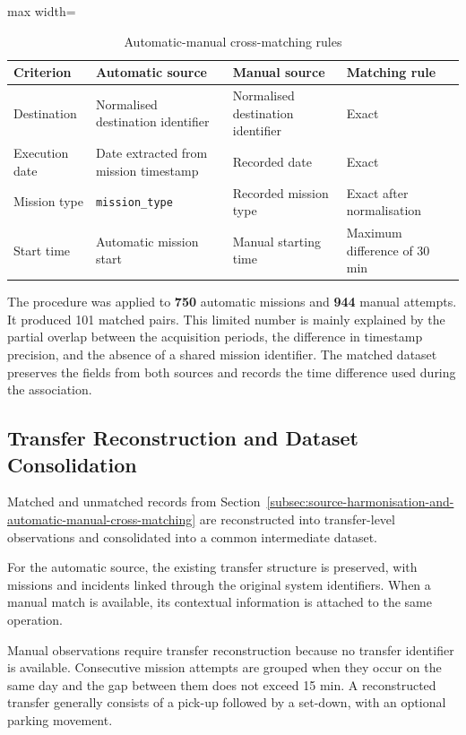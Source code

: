 \begin{table}[H]
\small
\renewcommand{\arraystretch}{1.15}
\centering
\caption{Automatic-manual cross-matching rules}
\label{tab:auto-manual-matching-rules}
\begin{adjustbox}{max width=\textwidth}
\begin{tabular}{|p{2.8cm}|p{4.2cm}|p{3.8cm}|p{4.0cm}|}
\hline
\textbf{Criterion} & \textbf{Automatic source} & \textbf{Manual source} & \textbf{Matching rule} \\
\hline
Destination & Normalised destination identifier & Normalised destination identifier & Exact \\
\hline
Execution date & Date extracted from mission timestamp & Recorded date & Exact \\
\hline
Mission type & \texttt{mission\_type} & Recorded mission type & Exact after normalisation \\
\hline
Start time & Automatic mission start & Manual starting time & Maximum difference of 30 min \\
\hline
\end{tabular}
\end{adjustbox}
\end{table}
The procedure was applied to \textbf{750} automatic missions and \textbf{944} manual attempts. It produced 101 matched pairs. This limited number is mainly explained by the partial overlap between the acquisition periods, the difference in timestamp precision, and the absence of a shared mission identifier. The matched dataset preserves the fields from both sources and records the time difference used during the association.

\subsection{Transfer Reconstruction and Dataset Consolidation}
\label{subsec:transfer-reconstruction-and-dataset-consolidation}
Matched and unmatched records from Section~\ref{subsec:source-harmonisation-and-automatic-manual-cross-matching} are reconstructed into transfer-level observations and consolidated into a common intermediate dataset.

For the automatic source, the existing transfer structure is preserved, with missions and incidents linked through the original system identifiers. When a manual match is available, its contextual information is attached to the same operation.

Manual observations require transfer reconstruction because no transfer identifier is available. Consecutive mission attempts are grouped when they occur on the same day and the gap between them does not exceed 15 min. A reconstructed transfer generally consists of a pick-up followed by a set-down, with an optional parking movement.

